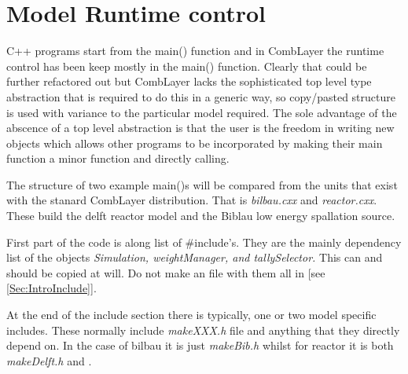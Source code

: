 
\section{Model Runtime control}

C++ programs start from the main() function and in CombLayer the
runtime control has been keep mostly in the main() function. Clearly
that could be further refactored out but CombLayer lacks the
sophisticated top level type abstraction that is required to do this
in a generic way, so copy/pasted structure is used with variance to
the particular model required. The sole advantage of the abscence of a
top level abstraction is that the user is the freedom in writing new objects
which allows other programs to be incorporated by making their main function
a minor function and directly calling.

The structure of two example main()s will be compared from the units
that exist with the stanard CombLayer distribution. That is {\it
bilbau.cxx} and {\it reactor.cxx}. These build the delft reactor model and the
Biblau low energy spallation source.

First part of the code is along list of \#include's. They are the
mainly dependency list of the objects {\it Simulation, weightManager,
and tallySelector.} This can and should be copied at will. Do not
make an file with them all in [see \ref{Sec:IntroInclude}].

At the end of the include section there is typically, one or two model
specific includes. These normally include {\it makeXXX.h} file and
anything that they directly depend on. In the case of bilbau it is just 
{\it makeBib.h} whilst for reactor it is both {\it makeDelft.h} and .



